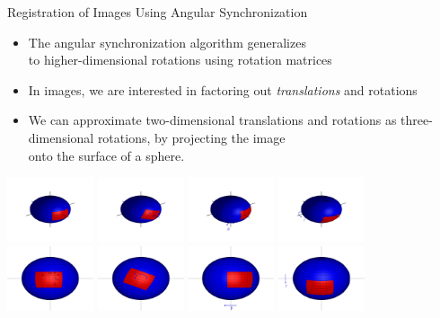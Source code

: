 \documentclass[10pt]{beamer}
\begin{document}
\begin{frame}{Registration of Images Using Angular Synchronization}
\begin{itemize}

\item The angular synchronization algorithm generalizes \\to higher-dimensional rotations using rotation matrices
\item In images, we are interested in factoring out {\em translations} and rotations
\item We can approximate two-dimensional translations and rotations as three-dimensional rotations, by projecting the image \\onto the surface of a sphere. 
\end{itemize}

\begin{center}
\includegraphics[width=1in]{sphere_1}
\includegraphics[width=1in]{sphere_2}
\includegraphics[width=1in]{sphere_3}
\includegraphics[width=1in]{sphere_4}\\
\includegraphics[width=1in]{sphere2_1}
\includegraphics[width=1in]{sphere2_2}
\includegraphics[width=1in]{sphere2_3}
\includegraphics[width=1in]{sphere2_4}


\end{center}
\end{frame}
\end{document}
